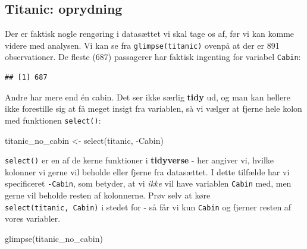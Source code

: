 \documentclass[
]{book}
\newenvironment{Shaded}{\begin{snugshade}}{\end{snugshade}}
\newcommand{\CommentTok}[1]{\textcolor[rgb]{0.56,0.35,0.01}{\textit{#1}}}
\newcommand{\FunctionTok}[1]{\textcolor[rgb]{0.00,0.00,0.00}{#1}}
\newcommand{\NormalTok}[1]{#1}
\newcommand{\OtherTok}[1]{\textcolor[rgb]{0.56,0.35,0.01}{#1}}
\newcommand{\SpecialCharTok}[1]{\textcolor[rgb]{0.00,0.00,0.00}{#1}}
\newcommand{\StringTok}[1]{\textcolor[rgb]{0.31,0.60,0.02}{#1}}
\begin{document}
\hypertarget{titanic-oprydning}{%
\subsection{Titanic: oprydning}\label{titanic-oprydning}}

Der er faktisk nogle rengøring i datasættet vi skal tage os af, før vi kan komme videre med analysen. Vi kan se fra \texttt{glimpse(titanic)} ovenpå at der er 891 observationer. De fleste (687) passagerer har faktisk ingenting for variabel \texttt{Cabin}:

\begin{Shaded}
\end{Shaded}

\begin{verbatim}
## [1] 687
\end{verbatim}

Andre har mere end én cabin. Det ser ikke særlig \textbf{tidy} ud, og man kan hellere ikke forestille sig at få meget insigt fra variablen, så vi vælger at fjerne hele kolon med funktionen \texttt{select()}:

\begin{Shaded}
\begin{Highlighting}[]
\NormalTok{titanic\_no\_cabin }\OtherTok{\textless{}{-}} \FunctionTok{select}\NormalTok{(titanic, }\SpecialCharTok{{-}}\NormalTok{Cabin) }
\end{Highlighting}
\end{Shaded}

\texttt{select()} er en af de kerne funktioner i \textbf{tidyverse} - her angiver vi, hvilke kolonner vi gerne vil beholde eller fjerne fra datasættet. I dette tilfælde har vi specificeret \texttt{-Cabin}, som betyder, at vi \emph{ikke} vil have variablen \texttt{Cabin} med, men gerne vil beholde resten af kolonnerne. Prøv selv at køre \texttt{select(titanic,\ Cabin)} i stedet for - så får vi kun \texttt{Cabin} og fjerner resten af vores variabler.

\begin{Shaded}
\begin{Highlighting}[]
\FunctionTok{glimpse}\NormalTok{(titanic\_no\_cabin)}
\end{Highlighting}
\end{Shaded}
\end{document}
